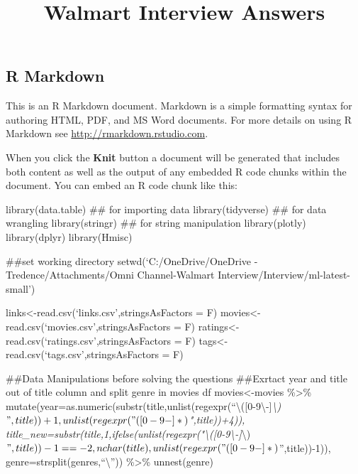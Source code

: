 \documentclass[]{article}
\title{Walmart Interview Answers}
\author{}
\date{}
\begin{document}
\maketitle

\hypertarget{r-markdown}{%
\subsection{R Markdown}\label{r-markdown}}

This is an R Markdown document. Markdown is a simple formatting syntax
for authoring HTML, PDF, and MS Word documents. For more details on
using R Markdown see \url{http://rmarkdown.rstudio.com}.

When you click the \textbf{Knit} button a document will be generated
that includes both content as well as the output of any embedded R code
chunks within the document. You can embed an R code chunk like this:

library(data.table) \#\# for importing data library(tidyverse) \#\# for
data wrangling library(stringr) \#\# for string manipulation
library(plotly) library(dplyr) library(Hmisc)

\#\#set working directory setwd(`C:/OneDrive/OneDrive -
Tredence/Attachments/Omni Channel-Walmart
Interview/Interview/ml-latest-small')

links\textless{}-read.csv(`links.csv',stringsAsFactors = F)
movies\textless{}-read.csv(`movies.csv',stringsAsFactors = F)
ratings\textless{}-read.csv(`ratings.csv',stringsAsFactors = F)
tags\textless{}-read.csv(`tags.csv',stringsAsFactors = F)

\#\#Data Manipulations before solving the questions \#\#Exrtact year and
title out of title column and split genre in movies df
movies\textless{}-movies \%\textgreater{}\%\\
mutate(year=as.numeric(substr(title,unlist(regexpr(``\textbackslash{}({[}0-9\textbackslash{}-{]}\emph{\textbackslash{})\(",title))+1,unlist(regexpr("\\([0-9\\-]*\\)\)",title))+4)),
title\_new=substr(title,1,ifelse(unlist(regexpr("\textbackslash{}({[}0-9\textbackslash{}-{]}}\textbackslash{})\(",title))-1==-2,nchar(title),unlist(regexpr("\\([0-9\\-]*\\)\)'',title))-1)),
genre=strsplit(genres,``\textbackslash{}\textbar{}''))
\%\textgreater{}\% unnest(genre)
\end{document}
